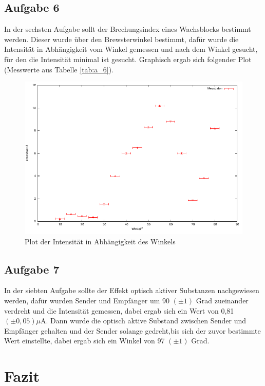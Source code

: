 \documentclass[12pt]{scrartcl}
\begin{document}
\subsection{Aufgabe 6}
In der sechsten Aufgabe sollt der Brechungsindex eines Wachsblocks bestimmt werden. Dieser wurde über den Brewsterwinkel bestimmt, dafür wurde die Intensität in Abhängigkeit vom Winkel gemessen und nach dem Winkel gesucht, für den die Intensität minimal ist gesucht. Graphisch ergab sich folgender Plot (Messwerte aus Tabelle \ref{tab:a_6}).

\begin{figure}[H]
\centering
    \includegraphics[scale = 1]{a_6.pdf}
  	\caption[Plot der Intensität in Abhängigkeit des Winkels]{Plot der Intensität in Abhängigkeit des Winkels}
  \label{fig:a_6}
\end{figure}

\subsection{Aufgabe 7}
In der siebten Aufgabe sollte der Effekt optisch aktiver Substanzen nachgewiesen werden, dafür wurden Sender und Empfänger um 90 $(\pm 1)$ Grad zueinander verdreht und die Intensität gemessen, dabei ergab sich ein Wert von 0,81 $(\pm 0,05) \mu$A.  Dann wurde die optisch aktive Substand zwischen Sender und Empfänger gehalten und der Sender solange gedreht,bis sich der zuvor bestimmte Wert einstellte, dabei ergab sich ein Winkel von 97 $(\pm 1)$ Grad.

\section{Fazit}



\end{document}
